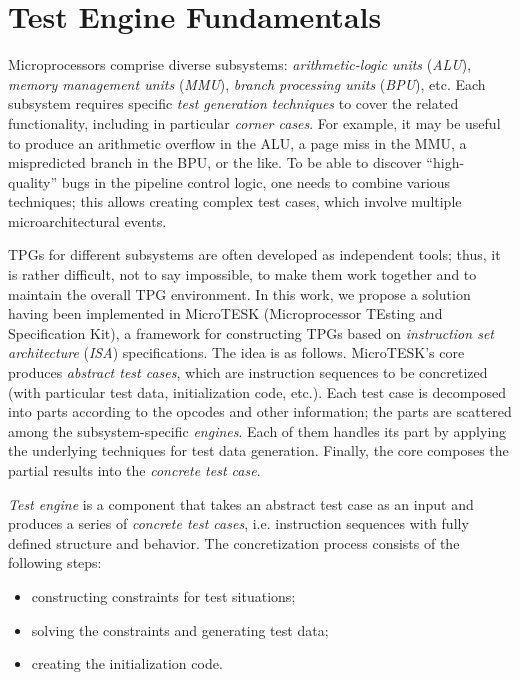 \section{Test Engine Fundamentals}

Microprocessors comprise diverse subsystems:
\emph{arithmetic-logic units} (\emph{ALU}), \emph{memory management units} (\emph{MMU}), \emph{branch processing units} (\emph{BPU}), etc.
Each subsystem requires specific \emph{test generation techniques} to cover the related functionality, including in particular \emph{corner cases}.
For example, it may be useful to produce an arithmetic overflow in the ALU, a page miss in the MMU, a mispredicted branch in the BPU, or the like.
To be able to discover ``high-quality'' bugs in the pipeline control logic, one needs to combine various techniques;
this allows creating complex test cases, which involve multiple microarchitectural events.

TPGs for different subsystems are often developed as independent tools;
thus, it is rather difficult, not to say impossible, to make them work together and to maintain the overall TPG environment.
In this work, we propose a solution having been implemented in MicroTESK (Microprocessor TEsting and Specification Kit),
a framework for constructing TPGs based on \emph{instruction set architecture} (\emph{ISA}) specifications.
The idea is as follows.
MicroTESK's core produces \emph{abstract test cases}, which are instruction sequences to be concretized (with particular test data, initialization code, etc.).
Each test case is decomposed into parts according to the opcodes and other information; the parts are scattered among the subsystem-specific \emph{engines}.
Each of them handles its part by applying the underlying techniques for test data generation.
Finally, the core composes the partial results into the \emph{concrete test case}.

\emph{Test engine} is a component that takes an abstract test case as an input and produces a series of \emph{concrete test cases},
i.e. instruction sequences with fully defined structure and behavior.
The concretization process consists of the following steps:

\begin{itemize}
\item
constructing constraints for test situations;
\item
solving the constraints and generating test data;
\item
creating the initialization code.
\end{itemize}

